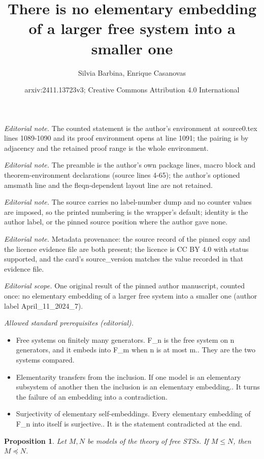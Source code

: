 \documentclass[10pt,a4paper]{article}
\title{There is no elementary embedding of a larger free system into a smaller one}
\author{Silvia Barbina, Enrique Casanovas}
\date{arxiv:2411.13723v3; Creative Commons Attribution 4.0 International}
\theoremstyle{note}
\newtheorem{prop}[thm]{Proposition}
\begin{document}
\maketitle
\noindent\textit{Editorial note.} The counted statement is the author's environment at source0.tex lines 1089-1090 and its proof environment opens at line 1091; the pairing is by adjacency and the retained proof range is the whole environment.\par\medskip
\noindent\textit{Editorial note.} The preamble is the author's own package lines, macro block and theorem-environment declarations (source lines 4-65); the author's optioned amsmath line and the fleqn-dependent layout line are not retained.\par\medskip
\noindent\textit{Editorial note.} The source carries no label-number dump and no counter values are imposed, so the printed numbering is the wrapper's default; identity is the author label, or the pinned source position where the author gave none.\par\medskip
\noindent\textit{Editorial note.} Metadata provenance: the source record of the pinned copy and the licence evidence file are both present; the licence is CC BY 4.0 with status supported, and the card's source\_version matches the value recorded in that evidence file.\par\medskip
\noindent\textit{Editorial scope.} One original result of the pinned author manuscript, counted once: no elementary embedding of a larger free system into a smaller one (author label April\_11\_2024\_7).\par\medskip
\noindent\textit{Allowed standard prerequisites (editorial).}\begin{itemize}
\item Free systems on finitely many generators. F\_n is the free system on n generators, and it embeds into F\_m when n is at most m.. They are the two systems compared.
\item Elementarity transfers from the inclusion. If one model is an elementary subsystem of another then the inclusion is an elementary embedding.. It turns the failure of an embedding into a contradiction.
\item Surjectivity of elementary self-embeddings. Every elementary embedding of F\_n into itself is surjective.. It is the statement contradicted at the end.
\end{itemize}\medskip
	\begin{prop}\label{April_11_2024_6}
		Let $M,N$ be models of the theory of free STSs. If $M\leq N$, then  $M\preccurlyeq N$.
	\end{prop}
\end{document}
